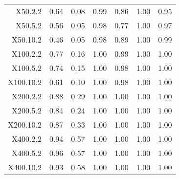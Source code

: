 \begin{table}[ht]
\begin{tabular}{rrrrrrr}
  X50.2.2 & 0.64 & 0.08 & 0.99 & 0.86 & 1.00 & 0.95 \\ 
  X50.5.2 & 0.56 & 0.05 & 0.98 & 0.77 & 1.00 & 0.97 \\ 
  X50.10.2 & 0.46 & 0.05 & 0.98 & 0.89 & 1.00 & 0.99 \\ 
  X100.2.2 & 0.77 & 0.16 & 1.00 & 0.99 & 1.00 & 1.00 \\ 
  X100.5.2 & 0.74 & 0.15 & 1.00 & 0.98 & 1.00 & 1.00 \\ 
  X100.10.2 & 0.61 & 0.10 & 1.00 & 0.98 & 1.00 & 1.00 \\ 
  X200.2.2 & 0.88 & 0.29 & 1.00 & 1.00 & 1.00 & 1.00 \\ 
  X200.5.2 & 0.84 & 0.24 & 1.00 & 1.00 & 1.00 & 1.00 \\ 
  X200.10.2 & 0.87 & 0.33 & 1.00 & 1.00 & 1.00 & 1.00 \\ 
  X400.2.2 & 0.94 & 0.57 & 1.00 & 1.00 & 1.00 & 1.00 \\ 
  X400.5.2 & 0.96 & 0.57 & 1.00 & 1.00 & 1.00 & 1.00 \\ 
  X400.10.2 & 0.93 & 0.58 & 1.00 & 1.00 & 1.00 & 1.00 \\ 
   \hline
\end{tabular}
\end{table}

